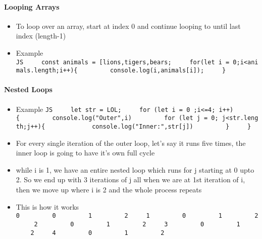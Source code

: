 \documentclass[
  paper=a4,
  ,captions=tableheading
]{scrartcl}
\providecommand{\tightlist}{%
  \setlength{\itemsep}{0pt}\setlength{\parskip}{0pt}}
\begin{document}
\hypertarget{looping-arrays}{%
\paragraph{Looping Arrays}\label{looping-arrays}}

\begin{itemize}
\tightlist
\item
  To loop over an array, start at index 0 and continue looping to until
  last index (length-1)
\item
  Example
  \texttt{JS\ \ \ \ \ const\ animals\ =\ {[}\textquotesingle{}lions\textquotesingle{},\textquotesingle{}tigers\textquotesingle{},\textquotesingle{}bears\textquotesingle{}{]};\ \ \ \ \ for(let\ i\ =\ 0;i\textless{}animals.length;i++)\{\ \ \ \ \ \ \ \ \ console.log(i,animals{[}i{]});\ \ \ \ \ \}}
\end{itemize}

\hypertarget{nested-loops}{%
\paragraph{Nested Loops}\label{nested-loops}}

\begin{itemize}
\tightlist
\item
  Example
  \texttt{JS\ \ \ \ \ let\ str\ =\ \textquotesingle{}LOL\textquotesingle{};\ \ \ \ \ for\ (let\ i\ =\ 0\ ;i\textless{}=4;\ i++)\{\ \ \ \ \ \ \ \ \ console.log("Outer",i)\ \ \ \ \ \ \ \ \ for\ (let\ j\ =\ 0;\ j\textless{}str.length;j++)\{\ \ \ \ \ \ \ \ \ \ \ \ \ console.log("Inner:",str{[}j{]})\ \ \ \ \ \ \ \ \ \}\ \ \ \ \ \}}
\item
  For every single iteration of the outer loop, let's say it runs five
  times, the inner loop is going to have it's own full cycle
\item
  while i is 1, we have an entire nested loop which runs for j starting
  at 0 upto 2. So we end up with 3 iterations of j all when we are at
  1st iteration of i, then we move up where i is 2 and the whole process
  repeats
\item
  This is how it works
  \texttt{0\ \ \ \ \ \ \ \ \ 0\ \ \ \ \ \ \ \ \ 1\ \ \ \ \ \ \ \ \ 2\ \ \ \ \ 1\ \ \ \ \ \ \ \ \ 0\ \ \ \ \ \ \ \ \ 1\ \ \ \ \ \ \ \ \ 2\ \ \ \ \ 2\ \ \ \ \ \ \ \ \ 0\ \ \ \ \ \ \ \ \ 1\ \ \ \ \ \ \ \ \ 2\ \ \ \ \ 3\ \ \ \ \ \ \ \ \ 0\ \ \ \ \ \ \ \ \ 1\ \ \ \ \ \ \ \ \ 2\ \ \ \ \ 4\ \ \ \ \ \ \ \ \ 0\ \ \ \ \ \ \ \ \ 1\ \ \ \ \ \ \ \ \ 2}
\end{itemize}
\end{document}
